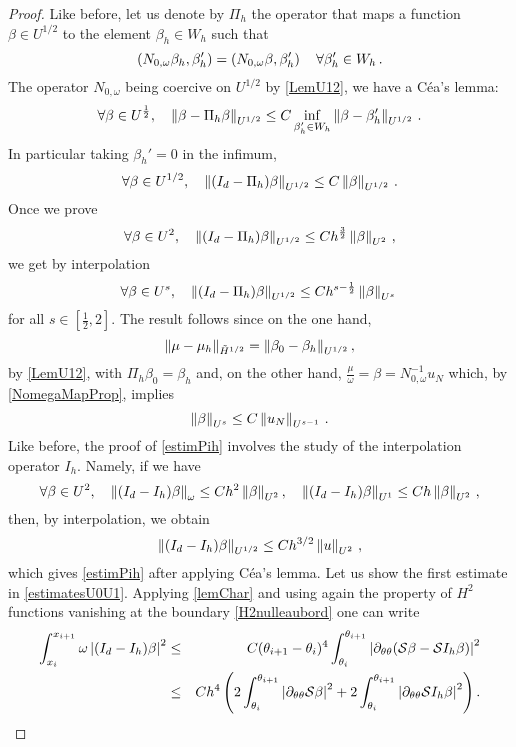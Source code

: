 \documentclass[a4paper]{article}
\begin{document}
\begin{proof}
	Like before, let us denote by $\Pi_h$ the operator that maps a function $\beta \in U^{1/2}$ to the element $\beta_h \in W_h$ such that
	\[\left( N_{0,\omega}\beta_h,\beta_h'\right) = \left( N_{0,\omega} \beta,\beta'_h\right) \quad \forall \beta_h' \in W_h\,.\]
	 The operator $N_{0,\omega}$ being coercive on $U^{1/2}$ by \autoref{LemU12}, we have a Céa's lemma: 
	\[\forall \beta \in U^{\frac{1}{2}},\quad \left\|\beta - \Pi_h \beta\right\|_{U^{1/2}} \leq C \inf_{\beta'_h \in W_h} \left\|\beta - \beta'_h\right\|_{U^{1/2}}\,.\] 
	In particular taking $\beta_h' = 0$ in the infimum,
	\[\forall \beta \in U^{1/2}, \quad \left\|(I_d - \Pi_h)\beta\right\|_{U^{1/2}} \leq C \left\|\beta\right\|_{U^{1/2}}\,.\]
	Once we prove 
	\begin{equation}
		\forall \beta \in U^{2},\quad  \left\|(I_d - \Pi_h)\beta\right\|_{U^{1/2}} \leq Ch^{\frac{3}{2}} \left\|\beta\right\|_{U^{2}}\,,
		\label{estimPih}
	\end{equation}
	we get by interpolation 
	\[\forall \beta \in U^{s}, \quad  \left\|(I_d - \Pi_h)\beta\right\|_{U^{1/2}} \leq Ch^{s - \frac{1}{2}} \left\|\beta\right\|_{U^{s}}\,\]
	for all $s \in [\frac{1}{2},2]$. The result follows since on the one hand,
	\[\left\|\mu - \mu_h\right\|_{\tilde{H}^{1/2}} = \left\|\beta_0 - \beta_h\right\|_{U^{1/2}},\]
	by \autoref{LemU12}, with $\Pi_h \beta_0 = \beta_h$ and, on the other hand, $\frac{\mu}{\omega} = \beta = N_{0,\omega}^{-1}u_N$ which, by \autoref{NomegaMapProp}, implies
	\[\left\|\beta\right\|_{U^s} \leq C \left\|u_N\right\|_{U^{s-1}}\,.\]
	Like before, the proof of \eqref{estimPih} involves the study of the interpolation operator $I_h$. Namely, if we have
	\begin{equation}
		\forall \beta \in U^2, \quad \left\| (I_d - I_h) \beta\right\|_{\omega} \leq Ch^2\left\|\beta\right\|_{U^2}, \quad 
		\left\|(I_d -I_h) \beta\right\|_{U^1} \leq Ch \left\|\beta\right\|_{U^2}\,,
		\label{estimatesU0U1}
	\end{equation}
	then, by interpolation, we obtain 
	\[\left\|(I_d - I_h) \beta\right\|_{U^{1/2}} \leq C h^{3/2}\left\|u\right\|_{U^2}\,,\]
	which gives \eqref{estimPih} after applying Céa's lemma. 
	Let us show the first estimate in \eqref{estimatesU0U1}. Applying \autoref{lemChar} and using again the property of $H^2$ functions vanishing at the boundary \eqref{H2nulleaubord} one can write
	\begin{eqnarray*}
		\int_{x_i}^{x_{i+1}} \omega \abs{(I_d - I_h) \beta}^2 &\leq& C  (\theta_{i+1} - \theta_i)^4 \int_{\theta_i}^{\theta_{i+1}} \abs{\partial_{\theta\theta}(\mathcal{S}\beta- \mathcal{S}I_h \beta)}^2 \\
		&\leq& C h^4 \left(2\int_{\theta_i}^{\theta_{i+1}} \abs{\partial_{\theta\theta}\mathcal{S}\beta}^2 + 2\int_{\theta_i}^{\theta_{i+1}}\abs{\partial_{\theta\theta}\mathcal{S}I_h \beta}^2\right).

\end{eqnarray*}
\end{proof}
\end{document}
